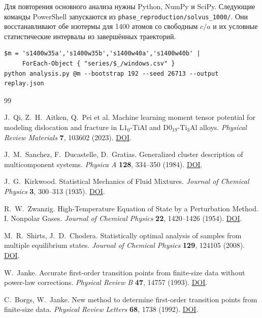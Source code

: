 \documentclass[11pt,a4paper]{article}
\begin{document}
Для повторения основного анализа нужны Python, NumPy и SciPy. Следующие
команды PowerShell запускаются из \nolinkurl{phase_reproduction/solvus_1000/}.
Они восстанавливают обе изотермы для 1400 атомов со свободным \(c/a\) и
их условные статистические интервалы из завершённых траекторий.
{\small
\begin{verbatim}
$m = 's1400w35a','s1400w35b','s1400w40a','s1400w40b' |
     ForEach-Object { "series/$_/windows.csv" }
python analysis.py @m --bootstrap 192 --seed 26713 --output replay.json
\end{verbatim}
}

\begin{thebibliography}{99}

J.~Qi, Z.~H.~Aitken, Q.~Pei et al.
Machine learning moment tensor potential for modeling dislocation and fracture
in \(\mathrm{L1}_0\)-TiAl and \(\mathrm{D0}_{19}\)-\(\mathrm{Ti}_3\mathrm{Al}\) alloys.
\emph{Physical Review Materials} \textbf{7}, 103602 (2023).
\href{https://doi.org/10.1103/PhysRevMaterials.7.103602}{DOI}.

J.~M.~Sanchez, F.~Ducastelle, D.~Gratias.
Generalized cluster description of multicomponent systems.
\emph{Physica A} \textbf{128}, 334--350 (1984).
\href{https://doi.org/10.1016/0378-4371(84)90096-7}{DOI}.

J.~G.~Kirkwood. Statistical Mechanics of Fluid Mixtures.
\emph{Journal of Chemical Physics} \textbf{3}, 300--313 (1935).
\href{https://doi.org/10.1063/1.1749657}{DOI}.

R.~W.~Zwanzig. High-Temperature Equation of State by a Perturbation Method.
I. Nonpolar Gases. \emph{Journal of Chemical Physics} \textbf{22}, 1420--1426 (1954).
\href{https://doi.org/10.1063/1.1740409}{DOI}.

M.~R.~Shirts, J.~D.~Chodera.
Statistically optimal analysis of samples from multiple equilibrium states.
\emph{Journal of Chemical Physics} \textbf{129}, 124105 (2008).
\href{https://doi.org/10.1063/1.2978177}{DOI}.

W.~Janke.
Accurate first-order transition points from finite-size data without power-law corrections.
\emph{Physical Review B} \textbf{47}, 14757 (1993).
\href{https://doi.org/10.1103/PhysRevB.47.14757}{DOI}.

C.~Borgs, W.~Janke.
New method to determine first-order transition points from finite-size data.
\emph{Physical Review Letters} \textbf{68}, 1738 (1992).
\href{https://doi.org/10.1103/PhysRevLett.68.1738}{DOI}.


\end{thebibliography}
\end{document}
